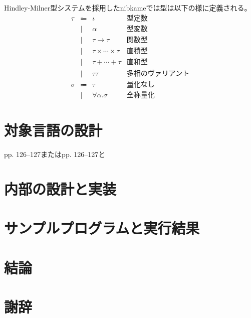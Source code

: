 \documentclass[a4paper,titlepage,report]{jsbook}
\newcommand{\dash}{\hspace{0.1em}--\hspace{0.1em}}
\begin{document}
Hindley-Milner型システムを採用したnibkameでは型は以下の様に定義される。
\begin{equation}\label{eq:type} 
\begin{array}{rcll}
    \tau    &\Coloneqq& \iota                       & \text{型定数} \\
            &\mid&  \alpha                          & \text{型変数} \\
            &\mid&  \tau \rightarrow \tau           & \text{関数型} \\
            &\mid&  \tau \times \cdots \times \tau  & \text{直積型} \\
            &\mid&  \tau + \cdots + \tau            & \text{直和型} \\
            &\mid&  \tau \tau                       & \text{多相のヴァリアント} \\
    \sigma  &\Coloneqq & \tau                       & \text{量化なし} \\
            &\mid&  \forall \alpha. \sigma          & \text{全称量化}
\end{array}
\end{equation}

\section{対象言語の設計}
pp. 126--127またはpp. 126\dash 127と
\section{内部の設計と実装}

\section{サンプルプログラムと実行結果}

\section{結論}\label{ch:結論}

\section*{謝辞}\label{sec:謝辞}




\backmatter
\appendix
\end{document}
